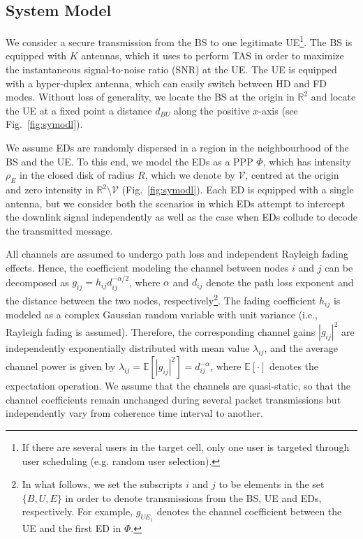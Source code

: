\documentclass[10pt]{IEEEtran}
\begin{document}
\subsection{System Model}
We consider a secure transmission from the BS to one legitimate UE\footnote{If there are several users in the target cell, only one user is targeted through user scheduling (e.g. random user selection).}. The BS is equipped with $K$ antennas, which it uses to perform TAS in order to maximize the instantaneous signal-to-noise ratio (SNR) at the UE.  The UE is equipped with a hyper-duplex antenna, which can easily switch between HD and FD modes.  Without loss of generality, we locate the BS at the origin in $\mathbb R^2$ and locate the UE at a fixed point a distance $d_{BU}$ along the positive $x$-axis (see Fig.~\ref{fig:symodl}).

We assume EDs are randomly dispersed in a region in the neighbourhood of the BS and the UE.  To this end, we model the EDs as a PPP $\Phi$, which has intensity $\rho_E$ in the closed disk of radius $R$, which we denote by $\mathcal V$, centred at the origin and zero intensity in $\mathbb R^2 \setminus \mathcal V$ (Fig.~\ref{fig:symodl}).  Each ED is equipped with a single antenna, but we consider both the scenarios in which EDs attempt to intercept the downlink signal independently as well as the case when EDs collude to decode the transmitted message.



All channels are assumed to undergo path loss and independent Rayleigh fading effects.  Hence, the coefficient modeling the channel between nodes $i$ and $j$ can be decomposed as $g_{ij} = h_{ij}d^{-\alpha/2}_{ij}$, where $\alpha$ and $d_{ij}$ denote the path loss exponent and the distance between the two nodes, respectively\footnote{In what follows, we set the subscripts $i$ and $j$ to be elements in the set $\{B,U,E\}$ in order to denote transmissions from the BS, UE and EDs, respectively.  For example, $g_{UE_1}$ denotes the channel coefficient between the UE and the first ED in $\Phi$.}. The fading coefficient $h_{ij}$ is modeled as a complex Gaussian random variable with unit variance (i.e., Rayleigh fading is assumed). Therefore, the corresponding channel gains $|g_{ij}|^{2}$ are independently exponentially distributed with mean value $\lambda_{ij}$, and the average channel power is given by $\lambda_{ij}=\mathbb E[|g_{ij}|^{2}] = d_{ij}^{-\alpha}$, where $\mathbb E[\cdot]$ denotes the expectation operation. We assume that the channels are quasi-static, so that the channel coefficients remain unchanged during several packet transmissions but independently vary from coherence time interval to another.
\end{document}
